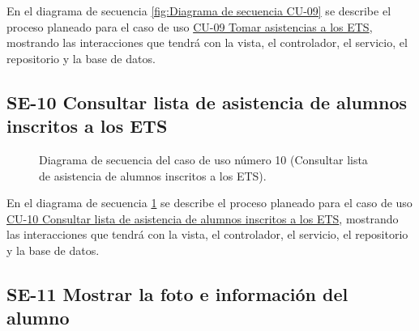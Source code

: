 En el diagrama de secuencia \ref{fig:Diagrama de secuencia CU-09} se describe el proceso planeado para el caso de uso \hyperlink{CU-09}{CU-09 Tomar asistencias a los ETS}, mostrando las interacciones que tendrá con la vista, el controlador, el servicio, el repositorio y la base de datos.

\subsection{SE-10 Consultar lista de asistencia de alumnos inscritos a los ETS}

\begin{figure}[htbp!]
	\begin{center}
		\caption{Diagrama de secuencia del caso de uso número 10 (Consultar lista de asistencia de alumnos inscritos a los ETS).}
		\label{fig:Diagrama de secuencia CU-10}
	\end{center}
\end{figure}

En el diagrama de secuencia \ref{fig:Diagrama de secuencia CU-10} se describe el proceso planeado para el caso de uso \hyperlink{CU-10}{CU-10 Consultar lista de asistencia de alumnos inscritos a los ETS}, mostrando las interacciones que tendrá con la vista, el controlador, el servicio, el repositorio y la base de datos.

\newpage

\subsection{SE-11 Mostrar la foto e información  del alumno}

